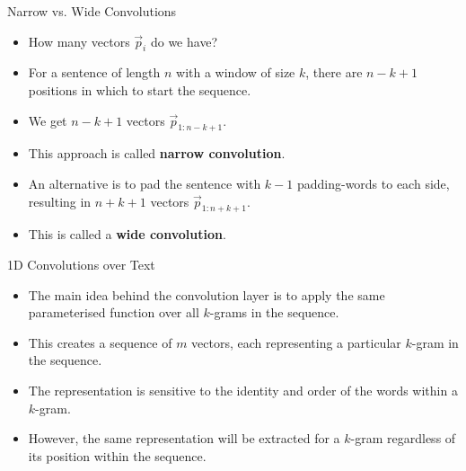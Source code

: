 \documentclass[handout]{beamer}
\begin{document}
\begin{frame}{Narrow vs. Wide Convolutions}
\begin{scriptsize}
\begin{itemize}
\item How many vectors $\vec{p}_i$ do we have?
\item For a sentence of length $n$ with a window of size $k$, there are $n - k + 1$ positions in which to start the sequence. 
\item We get $n - k + 1$ vectors $\vec{p}_{1:n-k+1}$. 
\item This approach is called \textbf{narrow convolution}.
\item An alternative is to pad the sentence with $k - 1$ padding-words to each side, resulting in $n+k+1$ vectors $\vec{p}_{1:n+k+1}$. 
\item This is called a \textbf{wide convolution}.
\end{itemize}
\end{scriptsize}
\end{frame}


\begin{frame}{1D Convolutions over Text}
\begin{scriptsize}
\begin{itemize}
\item The main idea behind the convolution layer is to apply the same parameterised function over all $k$-grams in the sequence.
\item This creates a sequence of $m$ vectors, each representing
a particular $k$-gram in the sequence.
\item The representation is sensitive to the identity and order of the words within a $k$-gram.
\item However, the same representation will be extracted for a $k$-gram regardless of its position within the sequence.
\end{itemize}
\end{scriptsize}
\end{frame}
\end{document}

